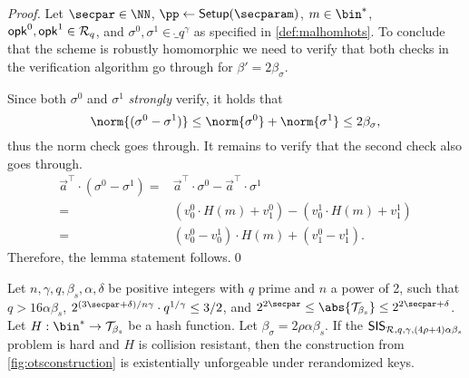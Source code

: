 \begin{proof}
  Let $\secpar\in\NN$, $\pp\gets\setup(\secparam)$, $m\in\bin^*$, $\mathsf{opk}^0,\mathsf{opk}^1\in \mathcal{R}_q$, and $\sigma^0,\sigma^1 \in \ring_q^\gamma$ as specified in \autoref{def:malhomhots}.
  To conclude that the scheme is robustly homomorphic we need to verify that both checks in the verification algorithm go through for $\beta'=2\beta_\sigma$.
  
  Since both $\sigma^0$ and $\sigma^1$ \emph{strongly} verify, it holds that
  \begin{equation*}
     \norm{(\sigma^0-\sigma^1)}
    \leq \norm{\sigma^0}+\norm{\sigma^1}
    \leq 2\beta_\sigma,
  \end{equation*}
  thus the norm check goes through. It remains to verify that the second check also goes through.
  \begin{align*}
     \vec{a}^\intercal\cdot (\sigma^0-\sigma^1)
    =& \vec{a}^\intercal\cdot \sigma^0- \vec{a}^\intercal\cdot\sigma^1\\
    =& (v^0_0\cdot H(m) + v^0_1) - (v^1_0\cdot H(m) + v^1_1)\tag{Def of $\sverify$}\\
    =& (v^0_0-v^1_0)\cdot H(m) + (v^0_1-v^1_1).
  \end{align*}
  Therefore, the lemma statement follows.\qed
\end{proof}


\begin{lemma}\label{lem:hots_sis}
  Let $n,\gamma,q,\beta_s,\alpha,\delta$ be positive integers with $q$ prime and $n$ a power of 2, such that $q > 16 \alpha \beta_s$, $2^{(3\secpar+\delta)/n\gamma} \cdot q^{1/\gamma} \leq 3/2$, and $2^{2\secpar} \leq \abs{\tern_{\beta_s}} \leq 2^{2\secpar + \delta}$.
  Let $H : \bin^* \to \tern_{\beta_s}$ be a hash function.
  Let $\beta_\sigma = 2\rho\alpha\beta_s$.
  If the $\mathsf{SIS}_{\mathcal{R},q,\gamma,(4\rho + 4)\alpha\beta_s}$ problem is hard and $H$ is collision resistant, then the construction from \autoref{fig:otsconstruction} is existentially unforgeable under rerandomized keys.
\end{lemma}

